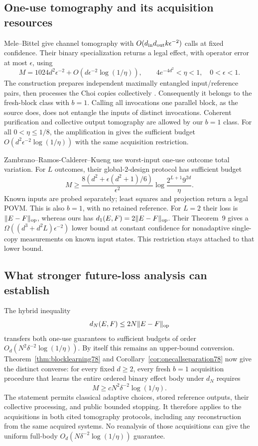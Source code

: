 \subsection{One-use tomography and its acquisition resources}
Mele--Bittel \cite[Theorem~I.1]{MB67} give channel tomography
with $O(d_{\rm in}d_{\rm out}k\epsilon^{-2})$ calls at fixed
confidence. Their binary specialization
\cite[Lemmas~III.7--III.8 and Corollary~III.9]{MB67} returns a
legal effect, with operator error at most $\epsilon$, using
\[
 M=1024d^2\epsilon^{-2}
   +O(d\epsilon^{-2}\log(1/\eta)),
 \qquad 4e^{-4d^2}<\eta<1,\quad 0<\epsilon<1.
\]
The construction prepares independent maximally entangled
input/reference pairs, then processes the Choi copies collectively
\cite[Algorithm~I.2, Figure~1 and Section~III.2]{MB67}.
Consequently it belongs to the fresh-block class with $b=1$.
Calling all invocations one parallel block, as the source does,
does not entangle the inputs of distinct invocations. Coherent
purification and collective output tomography are allowed by our
$b=1$ class. For all $0<\eta\le1/8$, the amplification in
\cite[Remark~III.4, equation~(165)]{MB67} gives the sufficient
budget $O(d^2\epsilon^{-2}\log(1/\eta))$ with the same acquisition
restriction.

Zambrano--Ramos-Calderer--Kueng \cite[Definition~1 and Theorem~2]{ZRK76}
use worst-input one-use outcome total variation. For $L$ outcomes,
their global-$2$-design protocol has sufficient budget
\[
 M\ge \frac{8(d^2+\epsilon(d^2+1)/6)}{\epsilon^2}
       \log\frac{2^{L+1}9^{2d}}{\eta}.
\]
Known inputs are probed separately; least squares and projection
return a legal POVM. This is also $b=1$, with no retained reference.
For $L=2$ their loss is $\|E-F\|_{\rm op}$, whereas ours has
$d_1(E,F)=2\|E-F\|_{\rm op}$. Their Theorem~9 gives a
$\Omega((d^3+d^2L)\epsilon^{-2})$ lower bound at constant confidence
for nonadaptive single-copy measurements on known input states.
This restriction stays attached to that lower bound.

\subsection{What stronger future-loss analysis can establish}
The hybrid inequality
\[
 d_N(E,F)\le 2N\|E-F\|_{\rm op}
\]
transfers both one-use guarantees to sufficient budgets of order
$O_d(N^2\delta^{-2}\log(1/\eta))$. By itself this remains an
upper-bound conversion. Theorem~\ref{thm:blocklearning78} and
Corollary~\ref{cor:onecallseparation78} now give the distinct
converse: for every fixed $d\ge2$, every fresh $b=1$ acquisition
procedure that learns the entire ordered binary effect body under
$d_N$ requires
\[
 M\ge cN^2\delta^{-2}\log(1/\eta).
\]
The statement permits classical adaptive choices, stored reference
outputs, their collective processing, and public bounded stopping.
It therefore applies to the acquisitions in both cited tomography
protocols, including any reconstruction from the same acquired
systems. No reanalysis of those acquisitions can give the uniform
full-body $O_d(N\delta^{-2}\log(1/\eta))$ guarantee.

